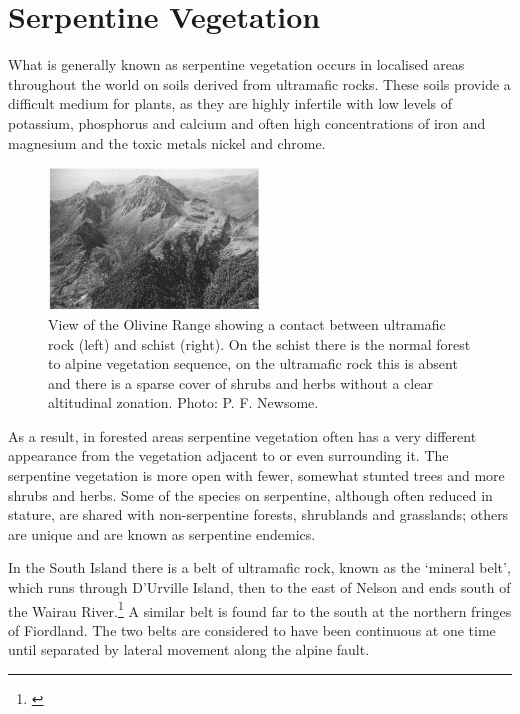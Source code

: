 \section{Serpentine Vegetation}

What is generally known as serpentine vegetation occurs in localised areas throughout the world on soils derived from ultramafic rocks.
These soils provide a difficult medium for plants, as they are highly infertile with low levels of potassium, phosphorus and calcium and often high concentrations of iron and magnesium and the toxic metals nickel and chrome.

\begin{figure}
	\includegraphics[width=0.5\textwidth]{graphics/figure89olivine-range.jpg}
	\centering
	\caption[View of the Olivine Range]{View of the Olivine Range showing a contact between ultramafic rock (left) and schist (right).
	On the schist there is the normal forest to alpine vegetation sequence, on the ultramafic rock this is absent and there is a sparse cover of shrubs and herbs without a clear altitudinal zonation.
	Photo: P. F. Newsome.}%
	\label{fig:89olivine-range}
\end{figure}

As a result, in forested areas serpentine vegetation often has a very different appearance from the vegetation adjacent to or even surrounding it.
The serpentine vegetation is more open with fewer, somewhat stunted trees and more shrubs and herbs.
Some of the species on serpentine, although often reduced in stature, are shared with non-serpentine forests, shrublands and grasslands; others are unique and are known as serpentine endemics.

In the South Island there is a belt of ultramafic rock, known as the `mineral belt', which runs through D'Urville Island, then to the east of Nelson and ends south of the Wairau River.\footnote{\cite{betts1918notes}}
A similar belt is found far to the south at the northern fringes of Fiordland.
The two belts are considered to have been continuous at one time until separated by lateral movement along the alpine fault.

